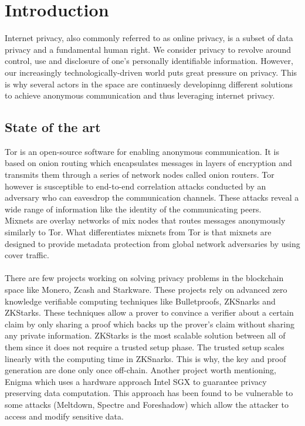 
\begin{abstract}

\end{abstract}
\section{Introduction}
Internet privacy, also commonly referred to as online privacy, is a subset of data privacy and a fundamental human right. We consider privacy to revolve around control, use and disclosure of one’s personally identifiable information.
However, our increasingly technologically-driven world puts great pressure on privacy. 
This is why several actors in the space are continuesly developinng different solutions to achieve anonymous communication and thus leveraging internet privacy.


\subsection*{State of the art}
Tor is an open-source software for enabling anonymous communication. It is based on onion routing which encapsulates messages in layers of encryption and transmits them through a series of network nodes called onion routers. Tor however is susceptible to end-to-end correlation attacks conducted by an adversary who can eavesdrop the communication channels. These attacks reveal a wide range of information like the identity of the communicating peers.
\\Mixnets are overlay networks of mix nodes that routes messages anonymously similarly to Tor. What differentiates mixnets from Tor is that mixnets are designed to provide metadata protection from global network adversaries by using cover traffic.
\\~\\There are few projects working on solving privacy problems in the blockchain space like Monero, Zcash and Starkware. These projects rely on advanced zero knowledge verifiable computing techniques like Bulletproofs, ZKSnarks  and ZKStarks. These techniques allow a prover to convince a verifier about a certain claim by only sharing a proof which backs up the prover’s claim without sharing any private information. ZKStarks is the most scalable solution between all of them since it does not require a trusted setup phase. The trusted setup scales linearly with the computing time in ZKSnarks. This is why, the key and proof generation are done only once off-chain. 
Another project worth mentioning, Enigma which uses a hardware approach Intel SGX to guarantee privacy preserving data computation. This approach has been found to be vulnerable to some attacks (Meltdown, Spectre and Foreshadow) which allow the attacker to access and modify sensitive data.





